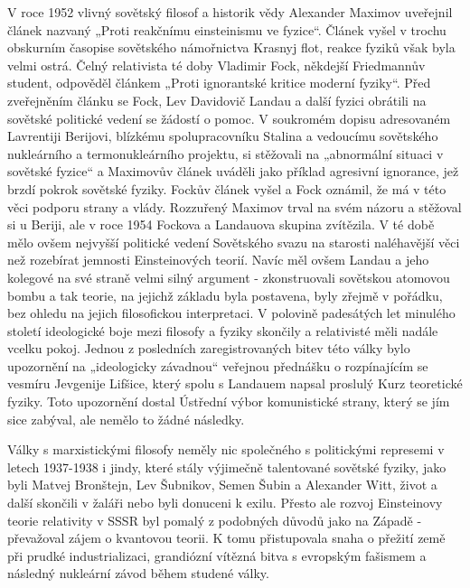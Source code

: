   V roce 1952 vlivný sovětský filosof a historik vědy Alexander Maximov uveřejnil článek nazvaný
  „Proti reakčnímu einsteinismu ve fyzice“. Článek vyšel v trochu obskurním časopise sovětského
  námořnictva Krasnyj flot, reakce fyziků však byla velmi ostrá. Čelný relativista té doby Vladimir
  Fock, někdejší Friedmannův student, odpověděl článkem „Proti ignorantské kritice moderní fyziky“.
  Před zveřejněním článku se Fock, Lev Davidovič Landau a další fyzici obrátili na sovětské
  politické vedení se žádostí o pomoc. V soukromém dopisu adresovaném Lavrentiji Berijovi, blízkému
  spolupracovníku Stalina a vedoucímu sovětského nukleárního a termonukleárního projektu, si
  stěžovali na „abnormální situaci v sovětské fyzice“ a Maximovův článek uváděli jako příklad
  agresivní ignorance, jež brzdí pokrok sovětské fyziky. Fockův článek vyšel a Fock oznámil, že má v
  této věci podporu strany a vlády. Rozzuřený Maximov trval na svém názoru a stěžoval si u Beriji,
  ale v roce 1954 Fockova a Landauova skupina zvítězila. V té době mělo ovšem nejvyšší politické
  vedení Sovětského svazu na starosti naléhavější věci než rozebírat jemnosti Einsteinových teorií.
  Navíc měl ovšem Landau a jeho kolegové na své straně velmi silný argument - zkonstruovali
  sovětskou atomovou bombu a tak teorie, na jejichž základu byla postavena, byly zřejmě v pořádku,
  bez ohledu na jejich filosofickou interpretaci. V polovině padesátých let minulého století
  ideologické boje mezi filosofy a fyziky skončily a relativisté měli nadále vcelku pokoj. Jednou z
  posledních zaregistrovaných bitev této války bylo upozornění na „ideologicky závadnou“ veřejnou
  přednášku o rozpínajícím se vesmíru Jevgenije Lifšice, který spolu s Landauem napsal proslulý Kurz
  teoretické fyziky. Toto upozornění dostal Ústřední výbor komunistické strany, který se jím sice
  zabýval, ale nemělo to žádné následky. 
  
  Války s marxistickými filosofy neměly nic společného s politickými represemi v letech 1937-1938 i
  jindy, které stály výjimečně talentované sovětské fyziky, jako byli Matvej Bronštejn, Lev
  Šubnikov, Semen Šubin a Alexander Witt, život a další skončili v žaláři nebo byli donuceni k
  exilu. Přesto ale rozvoj Einsteinovy teorie relativity v SSSR byl pomalý z podobných důvodů jako
  na Západě - převažoval zájem o kvantovou teorii. K tomu přistupovala snaha o přežití země při
  prudké industrializaci, grandiózní vítězná bitva s evropským fašismem a následný nukleární závod
  během studené války. 
  
